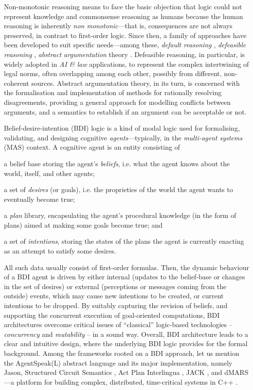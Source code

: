 \documentclass[12pt,a4paper,openright,twoside]{book}
\begin{document}
Non-monotonic reasoning means to face the basic objection \cite{minsky1975} that logic could not represent knowledge and commonsense reasoning as humans because the human reasoning is inherently \emph{non monotonic}---that is, consequences are not always preserved, in contrast to first-order logic.
%
Since then, a family of approaches have been developed to suit specific needs---among these, \emph{default reasoning} \cite{reiter1980}, \emph{defeasible reasoning} \cite{pollock1987}, \emph{abstract argumentation} theory \cite{bondarenko1997}.
%
Defeasible reasoning, in particular, is widely adopted in \emph{AI \& law} applications, to represent the complex intertwining of legal norms, often overlapping among each other, possibly from different, non-coherent sources.
%
Abstract argumentation theory, in its turn, is concerned with the formalisation and implementation of methods for rationally resolving disagreements, providing a general approach for modelling conflicts between arguments, and a semantics to establish if an argument can be acceptable or not.

Belief-desire-intention (BDI) logic is a kind of modal logic used for formalising, validating, and designing cognitive \emph{agents}---typically, in the \emph{multi-agent systems} (MAS) context.
%
A cognitive agent is an entity consisting of
%
\begin{inlinelist}
    \item a belief base storing the agent's \emph{beliefs}, i.e. what the agent knows about the world, itself, and other agents;
    \item a set of \emph{desires} (or goals), i.e. the proprieties of the world the agent wants to eventually become true;
    \item a \emph{plan} library, encapsulating the agent's procedural knowledge (in the form of plans) aimed at making some goals become true; and
    \item a set of \emph{intentions}, storing the states of the plans the agent is currently enacting as an attempt to satisfy some desires.
\end{inlinelist}
%
All such data usually consist of first-order formulas.
%
Then, the dynamic behaviour of a BDI agent is driven by either internal (updates to the belief-base or changes in the set of desires) or external (perceptions or messages coming from the outside) events, which may cause new intentions to be created, or current intentions to be dropped.
%
By suitably capturing the revision of beliefs, and supporting the concurrent execution of goal-oriented computations, BDI architectures overcome critical issues of ``classical'' logic-based technologies -- \emph{concurrency} and \emph{mutability} -- in a sound way.
%
Overall, BDI architecture leads to a clear and intuitive design, where the underlying BDI logic provides for the formal background.
%
Among the frameworks rooted on a BDI approach, let us mention the AgentSpeak(L) \cite{Rao96} abstract language and its major implementation, namely Jason, Structured Circuit Semantics \cite{lee1994}, Act Plan Interlingua \cite{huber1999-jam}, JACK \cite{howden2001}, and dMARS---a platform for building complex, distributed, time-critical systems in C++ \cite{dmars}.
\end{document}
